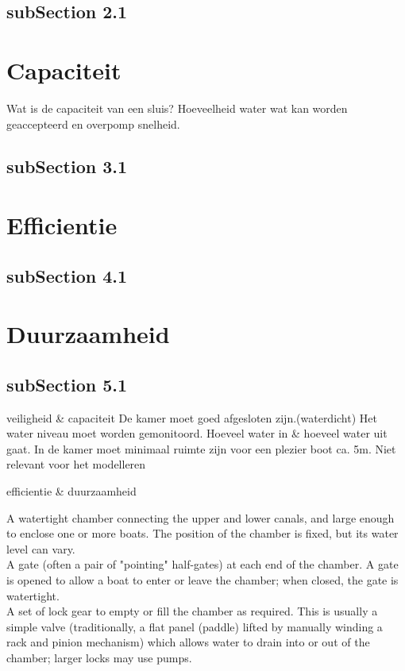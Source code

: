 \documentclass{article}
\begin{document}
\subsection{subSection 2.1}

\section{Capaciteit}
Wat is de capaciteit van een sluis? Hoeveelheid water wat kan worden geaccepteerd en overpomp snelheid.
\subsection{subSection 3.1}

\section{Efficientie}
\subsection{subSection 4.1}

\section{Duurzaamheid}
\subsection{subSection 5.1}

veiligheid & capaciteit
De kamer moet goed afgesloten zijn.(waterdicht)
	Het water niveau moet worden gemonitoord.
		Hoeveel water in & hoeveel water uit gaat.
In de kamer moet minimaal ruimte zijn voor een plezier boot ca. 5m.
	Niet relevant voor het modelleren


efficientie & duurzaamheid

A watertight chamber connecting the upper and lower canals, and large enough to enclose one or more boats. The position of the chamber is fixed, but its water level can vary.\\
A gate (often a pair of "pointing" half-gates) at each end of the chamber. A gate is opened to allow a boat to enter or leave the chamber; when closed, the gate is watertight.\\
A set of lock gear to empty or fill the chamber as required. This is usually a simple valve (traditionally, a flat panel (paddle) lifted by manually winding a rack and pinion mechanism) which allows water to drain into or out of the chamber; larger locks may use pumps.





\newpage

\newpage


\end{document}
